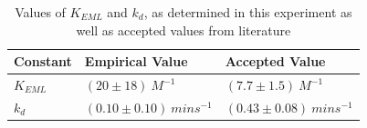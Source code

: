 \begin{table}[h]
    \begin{tabular}{| l | l | l |}
    \hline
    Constant & Empirical Value & Accepted Value \\ \hline
    $K_{EML}$ & $(20\pm{18}){\ }M^{-1}$ & $(7.7\pm{1.5}){\ }M^{-1}$     \cite{bib:easy_peasy_values} \\ \hline
    $k_{d}$ & $(0.10\pm{0.10}){\ }mins^{-1}$ & $(0.43\pm{0.08}){\ }mins^{-1}$     \cite{bib:easy_peasy_values} \\ 
    \hline
    \end{tabular}
    \caption[Table caption text]{Values of $K_{EML}$ and $k_d$, as determined in this experiment as well as accepted values from literature}
    \label{tbl:summary}
\end{table}